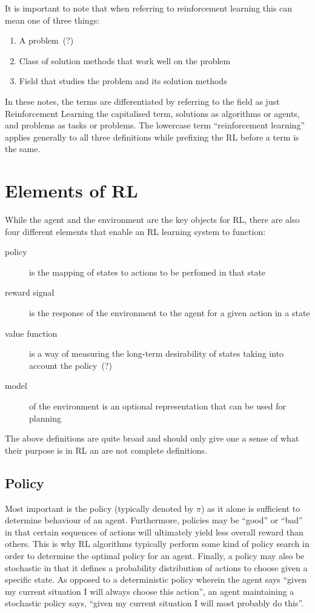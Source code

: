 \documentclass[12pt,notitlepage]{article}
\begin{document}
It is important to note that when referring to reinforcement learning this can
mean one of three things:
\begin{enumerate}
    \item A problem~(?)
    \item Class of solution methods that work well on the problem
    \item Field that studies the problem and its solution methods
\end{enumerate}

In these notes, the terms are differentiated by referring to the field as just
Reinforcement Learning the capitalised term, solutions as algorithms or agents,
and problems as tasks or problems. The lowercase term ``reinforcement
learning'' applies generally to all three definitions while prefixing the RL
before a term is the same. 

\section{Elements of RL}

While the agent and the environment are the key objects for RL, there are also
four different elements that enable an RL learning system to function:
\begin{description}
    \item[policy] is the mapping of states to actions to be perfomed in that
        state
    \item[reward signal] is the response of the environment to the agent for a
        given action in a state
    \item[value function] is a way of measuring the long-term desirability of
        states taking into account the policy~(?)
    \item[model] of the environment is an optional representation that can be
        used for planning
\end{description}

The above definitions are quite broad and should only give one a sense of what
their purpose is in RL an are not complete definitions.

\subsection{Policy}

Most important is the policy (typically denoted by $\pi$) as it alone is
sufficient to determine behaviour of an agent. Furthermore, policies may be
``good'' or ``bad'' in that certain sequences of actions will ultimately yield
less overall reward than others. This is why RL algorithms typically perform
some kind of policy search in order to determine the optimal policy for an
agent. Finally, a policy may also be stochastic in that it defines a
probability distribution of actions to choose given a specific state. As
opposed to a deterministic policy wherein the agent says ``given my current
situation I will always choose this action'', an agent maintaining a
stochastic policy says, ``given my current situation I will most probably do this''.
\end{document}
